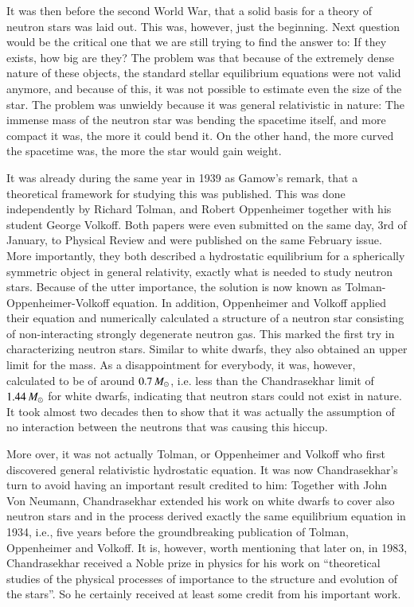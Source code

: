It was then before the second World War, that a solid basis for a theory of neutron stars was laid out.
This was, however, just the beginning. 
Next question would be the critical one that we are still trying to find the answer to:
If they exists, how big are they?
The problem was that because of the extremely dense nature of these objects, the standard stellar equilibrium equations were not valid anymore, and because of this, it was not possible to estimate even the size of the star.
The problem was unwieldy because it was general relativistic in nature:
The immense mass of the neutron star was bending the spacetime itself, and more compact it was, the more it could bend it. 
On the other hand, the more curved the spacetime was, the more the star would gain weight.

It was already during the same year in 1939 as Gamow's remark, that a theoretical framework for studying this was published.
This was done independently by Richard Tolman\cite{Tolman39}, and Robert Oppenheimer together with his student George Volkoff\cite{OV39}.
Both papers were even submitted on the same day, 3rd of January, to Physical Review and were published on the same February issue.
More importantly, they both described a hydrostatic equilibrium for a spherically symmetric object in general relativity, exactly what is needed to study neutron stars.
Because of the utter importance, the solution is now known as Tolman-Oppenheimer-Volkoff equation.
In addition, Oppenheimer and Volkoff applied their equation and numerically calculated a structure of a neutron star consisting of non-interacting strongly degenerate neutron gas.
This marked the first try in characterizing neutron stars.
Similar to white dwarfs, they also obtained an upper limit for the mass. 
As a disappointment for everybody, it was, however, calculated to be of around $0.7\, M_{\odot}$, i.e. less than the Chandrasekhar limit of $1.44\, M_{\odot}$ for white dwarfs, indicating that neutron stars could not exist in nature.
It took almost two decades then to show that it was actually the assumption of no interaction between the neutrons that was causing this hiccup.

More over, it was not actually Tolman, or Oppenheimer and Volkoff who first discovered general relativistic hydrostatic equation.
It was now Chandrasekhar's turn to avoid having an important result credited to him:
Together with John Von Neumann, Chandrasekhar extended his work on white dwarfs to cover also neutron stars and in the process derived exactly the same equilibrium equation in 1934, i.e., five years before the groundbreaking publication of Tolman, Oppenheimer and Volkoff.\cite{Baym82}
It is, however, worth mentioning that later on, in 1983, Chandrasekhar received a Noble prize in physics for his work on ``theoretical studies of the physical processes of importance to the structure and evolution of the stars''.
So he certainly received at least some credit from his important work.

